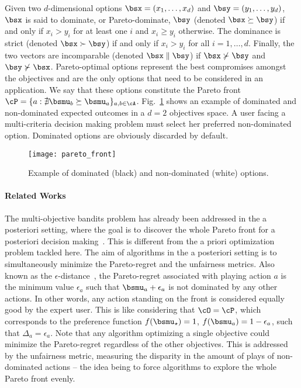 Given two $d$-dimensional options $\bsx = (x_1, \dots, x_d)$ and $\bsy = (y_1, \dots, y_d)$, $\bsx$ is said to dominate, or Pareto-dominate, $\bsy$ (denoted $\bsx \succeq \bsy$) if and only if $x_i > y_i$ for at least one $i$ and $x_i \geq y_i$ otherwise. The dominance is strict (denoted $\bsx \succ \bsy$) if and only if $x_i > y_i$ for all $i = 1, \dots, d$. Finally, the two vectors are incomparable (denoted $\bsx \parallel \bsy$) if $\bsx \nsucc \bsy$ and $\bsy \nsucc \bsx$. Pareto-optimal options represent the best compromises amongst the objectives and are the only options that need to be considered in an application. We say that these options constitute the Pareto front $\cP = \{ a : \nexists \bsmu_b \succeq \bsmu_a \}_{a, b \in \cA}$. Fig.~\ref{fig:pareto_front} shows an example of dominated and non-dominated expected outcomes in a $d = 2$ objectives space. A user facing a multi-criteria decision making problem must select her preferred non-dominated option. Dominated options are obviously discarded by default.

\begin{figure}[t]
    \centering
    \texttt{[image: pareto\_front]}
    \caption{Example of dominated (black) and non-dominated (white) options.}
\label{fig:pareto_front}
\end{figure}


\paragraph{Related Works}

The multi-objective bandits problem has already been addressed in the a posteriori setting, where the goal is to discover the whole Pareto front for a posteriori decision making~\cite{Drugan2013,Yahyaa2015}. This is different from the a priori optimization problem tackled here. The aim of algorithms in the a posteriori setting is to simultaneously minimize the Pareto-regret and the unfairness metrics. Also known as the $\epsilon$-distance~\cite{Laumanns2002}, the Pareto-regret associated with playing action $a$ is the minimum value $\epsilon_a$ such that $\bsmu_a + \epsilon_a$ is not dominated by any other actions. In other words, any action standing on the front is considered equally good by the expert user. This is like considering that $\cO = \cP$, which corresponds to the preference function $f(\bsmu_\star) = 1$, $f(\bsmu_a) = 1 - \epsilon_a$, such that $\Delta_a = \epsilon_a$. Note that any algorithm optimizing a single objective could minimize the Pareto-regret regardless of the other objectives. This is addressed by the unfairness metric, measuring the disparity in the amount of plays of non-dominated actions -- the idea being to force algorithms to explore the whole Pareto front evenly.

